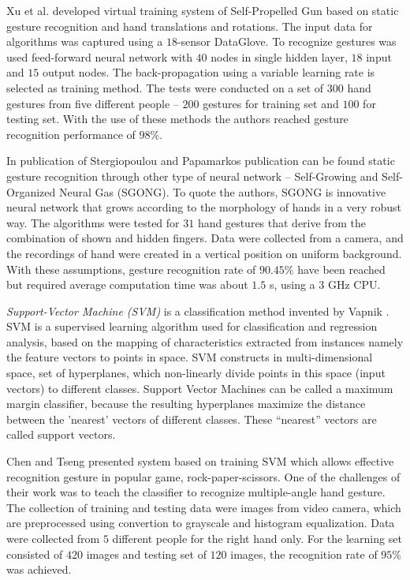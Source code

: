Xu et al. \cite{conf/icat/XuYZ06} developed virtual training system of Self-Propelled Gun based on static gesture recognition and hand translations and rotations. The input data for algorithms was captured using a $18$-sensor DataGlove. To recognize gestures was used feed-forward neural network with $40$ nodes in single hidden layer, $18$ input and $15$ output nodes. The back-propagation using a variable learning rate is selected as training method. The tests were conducted on a set of $300$ hand gestures from five different people -- $200$ gestures for training set and $100$ for testing set. With the use of these methods the authors reached gesture recognition performance of $98\%$.

In publication of Stergiopoulou and Papamarkos publication \cite {Stergiopoulou:2009:HGR:1651923.1651954} can be found static gesture recognition through other type of neural network -- Self-Growing and Self-Organized Neural Gas (SGONG). To quote the authors, SGONG is innovative neural network that grows according to the morphology of hands in a very robust way. The algorithms were tested for $31$ hand gestures that derive from the combination of shown and hidden fingers. Data were collected from a camera, and the recordings of hand were created in a vertical position on uniform background. With these assumptions, gesture recognition rate of $90.45\%$ have been reached but required average computation time was about $1.5$ s, using a $3$ GHz CPU.

\emph{Support-Vector Machine (SVM)} is a classification method invented by Vapnik \cite{Cortes:SVM}. SVM is a supervised learning algorithm used for classification and regression analysis, based on the mapping of characteristics extracted from instances namely the feature vectors to points in space. SVM constructs in multi-dimensional space, set of hyperplanes, which non-linearly divide points in this space (input vectors) to different classes. Support Vector Machines can be called a maximum margin classifier, because the resulting hyperplanes maximize the distance between the ’nearest’ vectors of different classes. These ``nearest'' vectors are called support vectors.

Chen and Tseng \cite{ChenDeveloping} presented system based on training SVM which allows effective recognition gesture in popular game, rock-paper-scissors. One of the challenges of their work was to teach the classifier to recognize multiple-angle hand gesture. The collection of training and testing data were images from video camera, which are preprocessed using convertion to grayscale and histogram equalization. Data were collected from $5$ different people for the right hand only. For the learning set consisted of $420$ images and testing set of $120$ images, the recognition rate of $95\%$ was achieved.

